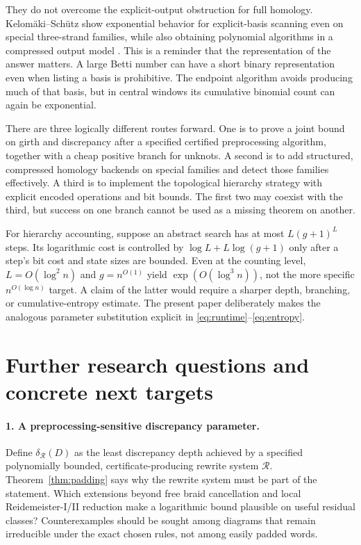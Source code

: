 \documentclass[11pt]{article}
\theoremstyle{definition}\newtheorem{definition}[theorem]{Definition}
\theoremstyle{remark}\newtheorem{remark}[theorem]{Remark}
\begin{document}
They do not overcome the explicit-output obstruction for full homology. Kelom\"aki--Sch\"utz show exponential behavior for explicit-basis scanning even on special three-strand families, while also obtaining polynomial algorithms in a compressed output model \cite{KS}. This is a reminder that the representation of the answer matters. A large Betti number can have a short binary representation even when listing a basis is prohibitive. The endpoint algorithm avoids producing much of that basis, but in central windows its cumulative binomial count can again be exponential.

There are three logically different routes forward. One is to prove a joint bound on girth and discrepancy after a specified certified preprocessing algorithm, together with a cheap positive branch for unknots. A second is to add structured, compressed homology backends on special families and detect those families effectively. A third is to implement the topological hierarchy strategy with explicit encoded operations and bit bounds. The first two may coexist with the third, but success on one branch cannot be used as a missing theorem on another.

For hierarchy accounting, suppose an abstract search has at most $L(g+1)^L$ steps. Its logarithmic cost is controlled by $\log L+L\log(g+1)$ only after a step's bit cost and state sizes are bounded. Even at the counting level, $L=O(\log^2 n)$ and $g=n^{O(1)}$ yield $\exp(O(\log^3 n))$, not the more specific $n^{O(\log n)}$ target. A claim of the latter would require a sharper depth, branching, or cumulative-entropy estimate. The present paper deliberately makes the analogous parameter substitution explicit in \eqref{eq:runtime}--\eqref{eq:entropy}.

\section{Further research questions and concrete next targets}
\label{sec:future}
\paragraph{1. A preprocessing-sensitive discrepancy parameter.}
Define $\delta_{\mathcal R}(D)$ as the least discrepancy depth achieved by a specified polynomially bounded, certificate-producing rewrite system $\mathcal R$. Theorem~\ref{thm:padding} says why the rewrite system must be part of the statement. Which extensions beyond free braid cancellation and local Reidemeister-I/II reduction make a logarithmic bound plausible on useful residual classes? Counterexamples should be sought among diagrams that remain irreducible under the exact chosen rules, not among easily padded words.
\end{document}
